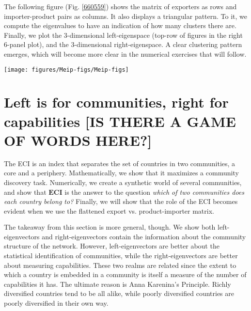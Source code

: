 \documentclass{pnastwo}
\renewcommand{\vec}[1]{\mathbf{#1}}
\begin{document}
\begin{article}
The following figure (Fig. {\ref{660559}}) shows the
matrix of exporters as rows and importer-product pairs as columns. It
also displays a triangular pattern. To it, we compute the eigenvalues to
have an indication of how many clusters there are. Finally, we plot the
3-dimensional left-eigenspace (top-row of figures in the right 6-panel
plot), and the 3-dimensional right-eigenspace. A clear clustering
pattern emerges, which will become more clear in the numerical exercises
that will follow.
\begin{figure*}[h]
\begin{center}
\texttt{[image: figures/Meip-figs/Meip-figs]}
\caption{{Real data from the matrix of exporters (rows) vs importer-products
(columns). The density of eigenvalues provides a sense of the number of
communities of exporters by counting the number of large eigenvalues.
The density of the distribution of values of ECI is a further indication
of the number of communities. However, the communities become clear on
the left-eigenspace (each dot is an exporter), which is shown on the
three row-panels. We color the five continents of the exporters,
supporting the idea that exporters belong to the same geographical
communities. The bottom row of 3 panels shows the right-eigenspace,
which we hypothesize provides a measure of the underlying capabilities
of exporters.
{\label{660559}}%
}}
\end{center}
\end{figure*}

\section{Left is for communities, right for capabilities [IS THERE A GAME OF WORDS HERE?]}
\label{sec:communityindex}
The ECI is an index that separates the set of countries in two communities, a core and a periphery. Mathematically, we show that it maximizes a community discovery task. Numerically, we create a synthetic world of several communities, and show that $\vec{ECI}$ is the answer to the question \emph{which of two communities does each country belong to?} Finally, we will show that the role of the ECI becomes evident when we use the flattened export vs. product-importer matrix.

The takeaway from this section is more general, though. We show both left-eigenvectors and right-eigenvectors contain the information about the community structure of the network. However, left-eigenvectors are better about the statistical identification of communities, while the right-eigenvectors are better about measuring capabilities. These two realms are related since the extent to which a country is embedded in a community is itself a measure of the number of capabilities it has. The ultimate reason is Anna Karenina's Principle. Richly diversified countries tend to be all alike, while poorly diversified countries are poorly diversified in their own way.





\end{article}
\end{document}
